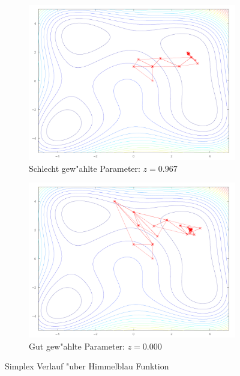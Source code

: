 \begin{figure}[htb]
\centering
\begin{subfigure}[b]{0.49\textwidth}
\centering
\includegraphics[width=\textwidth]{../bilder/HimmelblauBad/himmelblauall.png}
\caption{Schlecht gew"ahlte Parameter: $z=0.967$}
\end{subfigure} \begin{subfigure}[b]{0.49\textwidth}
\centering
\includegraphics[width=\textwidth]{../bilder/HimmelblauGood/himmelblauall.png}
\caption{Gut gew"ahlte Parameter: $z=0.000$}
\end{subfigure}

\caption{Simplex Verlauf "uber Himmelblau Funktion}
\label{fig:downhillHimmelblau}
\end{figure}
